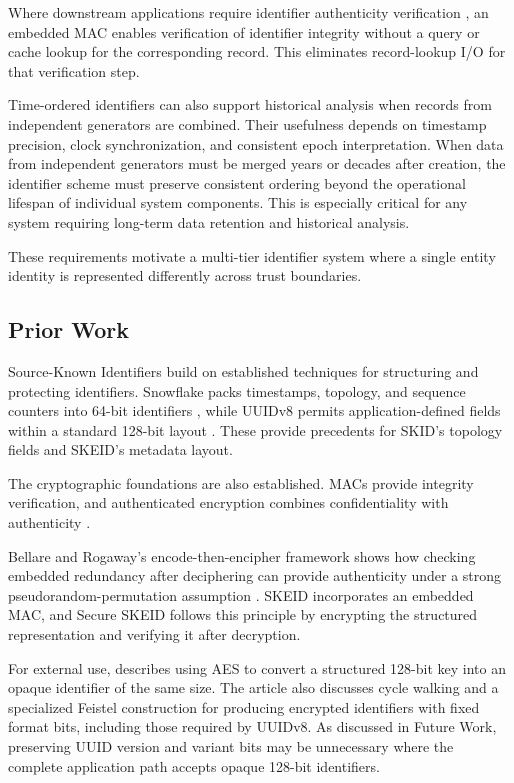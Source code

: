\documentclass[a4paper,fleqn]{cas-sc}
\begin{document}
Where downstream applications require identifier authenticity
verification \citep{cwe345}, an embedded MAC enables verification of
identifier integrity without a query or cache lookup for the
corresponding record. This eliminates record-lookup I/O for that
verification step.

Time-ordered identifiers \citep{rfc9562} can also support historical
analysis when records from independent generators are combined. Their
usefulness depends on timestamp precision, clock synchronization, and
consistent epoch interpretation. When data from independent generators
must be merged years or decades after creation, the identifier scheme
must preserve consistent ordering beyond the operational lifespan of
individual system components. This is especially critical for any system
requiring long-term data retention and historical analysis.

These requirements motivate a multi-tier identifier system where a
single entity identity is represented differently across trust
boundaries.

\subsection{Prior Work}\label{prior-work}

Source-Known Identifiers build on established techniques for structuring
and protecting identifiers. Snowflake packs timestamps, topology, and
sequence counters into 64-bit identifiers \citep{snowflake}, while
UUIDv8 permits application-defined fields within a standard 128-bit
layout \citep[Section 5.8]{rfc9562}. These provide precedents for SKID's
topology fields and SKEID's metadata layout.

The cryptographic foundations are also established. MACs provide
integrity verification, and authenticated encryption combines
confidentiality with authenticity \citep{rfc4493, rfc5297, rfc5116}.

Bellare and Rogaway's encode-then-encipher framework shows how checking
embedded redundancy after deciphering can provide authenticity under a
strong pseudorandom-permutation assumption \citep[Theorem
2]{bellare2000}. SKEID incorporates an embedded MAC, and Secure SKEID
follows this principle by encrypting the structured representation and
verifying it after decryption.

For external use, \citet{khuong2022} describes using AES to convert a
structured 128-bit key into an opaque identifier of the same size. The
article also discusses cycle walking and a specialized Feistel
construction for producing encrypted identifiers with fixed format bits,
including those required by UUIDv8. As discussed in Future Work,
preserving UUID version and variant bits may be unnecessary where the
complete application path accepts opaque 128-bit identifiers.
\end{document}
